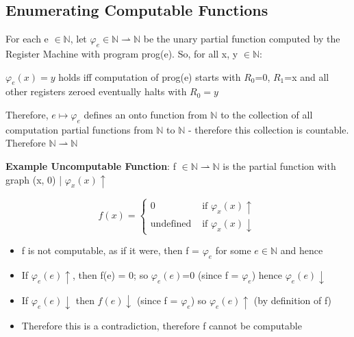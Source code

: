 \documentclass{article}
\begin{document}
\subsection{Enumerating Computable Functions}
For each e $\in \mathbb{N}$, let $\varphi_{e} \in \mathbb{N} \rightharpoonup \mathbb{N}$ be the unary partial function computed by the Register Machine with program prog(e). So, for all x, y $\in \mathbb{N}$:

\bigskip
$\varphi_{e}(x)=y $ holds iff computation of prog(e) starts with $R_{0}$=0, $R_{1}$=x and all other registers zeroed eventually halts with $R_{0}=y$

\bigskip
Therefore, $e \mapsto \varphi_{e}$ defines an onto function from $\mathbb{N}$ to the collection of all computation partial functions from $\mathbb{N}$ to $\mathbb{N}$ - therefore this collection is countable. Therefore $\mathbb{N} \rightharpoonup \mathbb{N}$

\bigskip
\noindent
\textbf{Example Uncomputable Function}: f $\in \mathbb{N} \rightharpoonup \mathbb{N}$ is the partial function with graph {(x, 0) | $\varphi_{x}(x)\uparrow$}

\begin{equation}
f(x)=\left\{\begin{array}{ll}{0} & {\text { if } \varphi_{x}(x) \uparrow} \\ {\text {undefined}} & {\text { if } \varphi_{x}(x) \downarrow}\end{array}\right.
\end{equation}

\begin{itemize}
    \item f is not computable, as if it were, then f = $\varphi_{e}$ for some $e \in \mathbb{N}$ and hence
    \item If $\varphi_{e}(e)\uparrow$, then f(e) = 0; so $\varphi_{e}(e)$=0 (since f = $\varphi_{e}$) hence $\varphi_{e}(e)\downarrow$
    \item If $\varphi_{e}(e)\downarrow$ then $f(e)\downarrow$ (since f = $\varphi_{e}$) so $\varphi_{e}(e)\uparrow$ (by definition of f)
    \item Therefore this is a contradiction, therefore f cannot be computable
\end{itemize}
\end{document}
